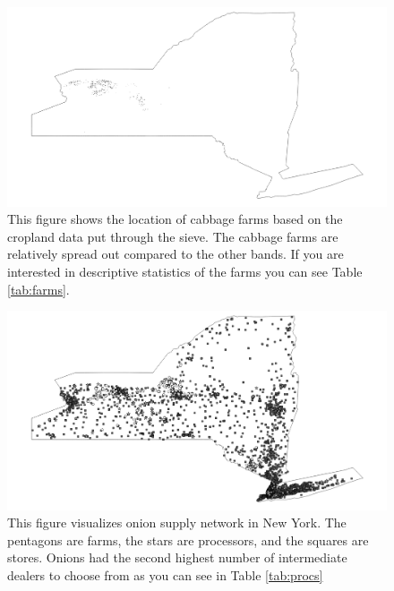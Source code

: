\documentclass{report}
\begin{document}
\begin{figure}
\centering
\begin{framed}
\includegraphics[scale=.50]{farms_243}
\caption{This figure shows the location of cabbage farms based on the cropland data put through the sieve. The cabbage farms are relatively spread out compared to the other bands. If you are interested in descriptive statistics of the farms you can see Table \ref{tab:farms}.}
\label{fig:farms_243}
\end{framed}
\end{figure}


\begin{figure}
\centering
\begin{framed}
\includegraphics[scale=.50]{network_49}
\caption{This figure visualizes onion supply network in New York. The pentagons are farms, the stars are processors, and the squares are stores. Onions had the second highest number of intermediate dealers to choose from as you can see in Table \ref{tab:procs}}
\label{fig:network_49}
\end{framed}
\end{figure}
\end{document}
